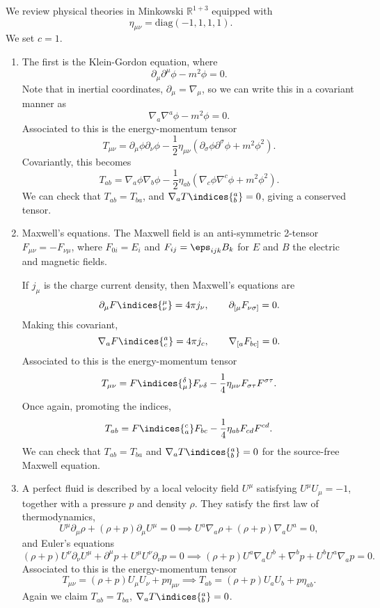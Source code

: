\documentclass[12pt]{article}
\begin{document}
We review physical theories in Minkowski $\mathbb{R}^{1 + 3}$ equipped with
\[
\eta_{\mu\nu} = \mathrm{diag}(-1, 1, 1, 1).
\]
We set $c = 1$.
\begin{enumerate}
	\item The first is the Klein-Gordon equation, where
		\[
		\partial_\mu \partial^\mu \phi - m^2 \phi = 0.
		\]
		Note that in inertial coordinates, $\partial_\mu = \nabla_\mu$, so we can write this in a covariant manner as
		\[
		\nabla_a \nabla^a \phi - m^2 \phi = 0.
		\]
		Associated to this is the energy-momentum tensor
		\[
		T_{\mu\nu} = \partial_\mu \phi \partial_\nu \phi - \frac{1}{2} \eta_{\mu\nu} (\partial_\sigma \phi \partial^\sigma \phi + m^2 \phi^2).
		\]
		Covariantly, this becomes
		\[
		T_{ab} = \nabla_a \phi \nabla_b \phi - \frac{1}{2} \eta_{ab} (\nabla_c \phi \nabla^c \phi + m^2 \phi^2).
		\]
		We can check that $T_{ab} = T_{ba}$, and $\nabla_a T\indices{^{a}_{b}} = 0$, giving a conserved tensor.
	\item Maxwell's equations. The Maxwell field is an anti-symmetric 2-tensor $F_{\mu\nu} = - F_{\nu\mu}$, where $F_{0i} = E_i$ and $F_{ij} = \eps_{ijk} B_k$ for $E$ and $B$ the electric and magnetic fields.

		If $j_\mu$ is the charge current density, then Maxwell's equations are
		\[
			\partial_\mu F\indices{^{\mu}_{\nu}} = 4 \pi j_\nu, \qquad \partial_{[\mu} F_{\nu \sigma]} = 0.
		\]
		Making this covariant,
		\[
			\nabla_a F\indices{^{a}_{c}} = 4 \pi j_c, \qquad \nabla_{[a} F_{bc]} = 0.
		\]
		Associated to this is the energy-momentum tensor
		\[
		T_{\mu\nu} = F\indices{_{\mu}^{\delta}} F_{\nu\delta} - \frac{1}{4} \eta_{\mu\nu} F_{\sigma\tau} F^{\sigma\tau}.
		\]
		Once again, promoting the indices,
		\[
		T_{ab} = F\indices{_{a}^{c}} F_{bc} - \frac{1}{4} \eta_{ab} F_{cd} F^{cd}.
		\]
		We can check that $T_{ab} = T_{ba}$ and $\nabla_a T\indices{^{a}_{b}} = 0$ for the source-free Maxwell equation.
	\item A perfect fluid is described by a local velocity field $U^{\mu}$ satisfying $U^\mu U_\mu = -1$, together with a pressure $p$ and density $\rho$. They satisfy the first law of thermodynamics,
		\[
		U^{\mu} \partial_\mu \rho + (\rho + p) \partial_\mu U^\mu = 0 \implies U^a \nabla_a \rho + (\rho + p)\nabla_a U^a = 0,
		\]
		and Euler's equations
		\[
			(\rho + p) U^\nu \partial_\nu U^\mu + \partial^\mu p + U^\mu U^\nu \partial_\nu p = 0 \implies (\rho + p) U^a \nabla_a U^b + \nabla^b p + U^b U^a \nabla_a p = 0.
		\]
		Associated to this is the energy-momentum tensor
		\[
		T_{\mu\nu} = (\rho + p) U_\mu U_\nu + p \eta_{\mu\nu} \implies T_{ab} = (\rho + p) U_a U_b + p \eta_{ab}.
		\]
		Again we claim $T_{ab} = T_{ba}$, $\nabla_a T\indices{^{a}_{b}} = 0$.
\end{enumerate}
\end{document}
